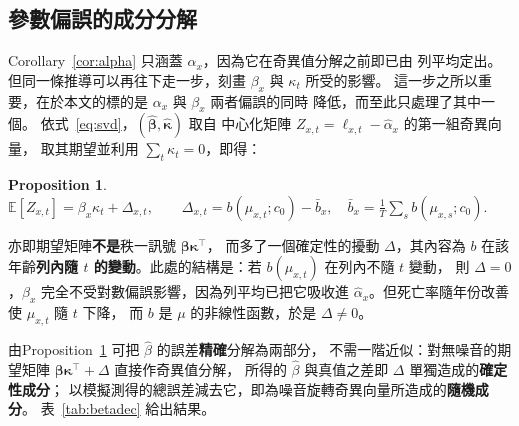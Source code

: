 \documentclass[UTF8, fontset=macnew, a4paper, 12pt]{ctexart}
\newtheorem{prop}{Proposition}
\newcommand{\Ex}{\mathbb{E}}
\begin{document}
\subsection{參數偏誤的成分分解}\label{sec:betadec}

Corollary~\ref{cor:alpha} 只涵蓋 $\alpha_x$，因為它在奇異值分解之前即已由
列平均定出。但同一條推導可以再往下走一步，刻畫 $\beta_x$ 與 $\kappa_t$ 所受的影響。
這一步之所以重要，在於本文的標的是 $\alpha_x$ 與 $\beta_x$ 兩者偏誤的同時
降低，而至此只處理了其中一個。
依式~\eqref{eq:svd}，$(\hat{\boldsymbol\beta},\hat{\boldsymbol\kappa})$ 取自
中心化矩陣 $Z_{x,t}=\ell_{x,t}-\hat\alpha_x$ 的第一組奇異向量，
取其期望並利用 $\sum_t\kappa_t=0$，即得：

\begin{prop}\label{prop:beta}
$\displaystyle \Ex[Z_{x,t}]=\beta_x\kappa_t+\Delta_{x,t},\qquad
\Delta_{x,t}=b(\mu_{x,t};c_0)-\bar b_x,\quad
\bar b_x=\frac1T\sum_s b(\mu_{x,s};c_0).$
\end{prop}

亦即期望矩陣\textbf{不是}秩一訊號 $\boldsymbol\beta\boldsymbol\kappa^{\top}$，
而多了一個確定性的擾動 $\Delta$，其內容為 $b$ 在該年齡\textbf{列內隨 $t$
的變動}。此處的結構是：若 $b(\mu_{x,t})$ 在列內不隨 $t$ 變動，
則 $\Delta=0$，$\beta_x$ 完全不受對數偏誤影響，因為列平均已把它吸收進
$\hat\alpha_x$。但死亡率隨年份改善使 $\mu_{x,t}$ 隨 $t$ 下降，
而 $b$ 是 $\mu$ 的非線性函數，於是 $\Delta\ne0$。

由Proposition~\ref{prop:beta} 可把 $\hat\beta$ 的誤差\textbf{精確}分解為兩部分，
不需一階近似：對無噪音的期望矩陣
$\boldsymbol\beta\boldsymbol\kappa^{\top}+\Delta$ 直接作奇異值分解，
所得的 $\hat\beta$ 與真值之差即 $\Delta$ 單獨造成的\textbf{確定性成分}；
以模擬測得的總誤差減去它，即為噪音旋轉奇異向量所造成的\textbf{隨機成分}。
表~\ref{tab:betadec} 給出結果。
\end{document}
